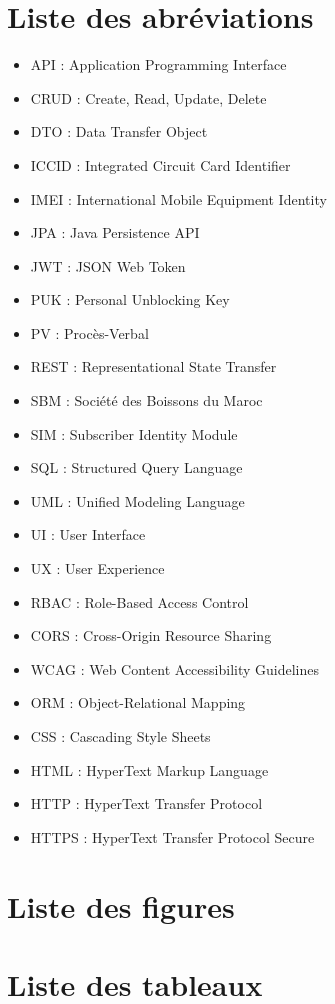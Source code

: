 \documentclass[12pt,a4paper]{report}
\begin{document}
\chapter*{Liste des abréviations}
\begin{itemize}
\item API : Application Programming Interface
\item CRUD : Create, Read, Update, Delete
\item DTO : Data Transfer Object
\item ICCID : Integrated Circuit Card Identifier
\item IMEI : International Mobile Equipment Identity
\item JPA : Java Persistence API
\item JWT : JSON Web Token
\item PUK : Personal Unblocking Key
\item PV : Procès-Verbal
\item REST : Representational State Transfer
\item SBM : Société des Boissons du Maroc
\item SIM : Subscriber Identity Module
\item SQL : Structured Query Language
\item UML : Unified Modeling Language
\item UI : User Interface
\item UX : User Experience
\item RBAC : Role-Based Access Control
\item CORS : Cross-Origin Resource Sharing
\item WCAG : Web Content Accessibility Guidelines
\item ORM : Object-Relational Mapping
\item CSS : Cascading Style Sheets
\item HTML : HyperText Markup Language
\item HTTP : HyperText Transfer Protocol
\item HTTPS : HyperText Transfer Protocol Secure
\end{itemize}

\chapter*{Liste des figures}
\listoffigures
\chapter*{Liste des tableaux}
\listoftables
\tableofcontents
\end{document}
